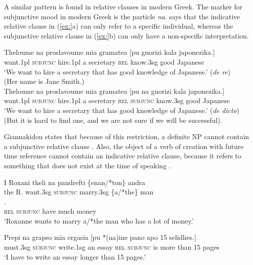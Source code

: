 A similar pattern is found in relative clauses in modern Greek. The marker for subjunctive mood in modern Greek is the particle \textit{na}. \citet{Giannakidou2011} says that the indicative relative clause in (\ref{ex:}a) can only refer to a specific individual, whereas the subjunctive relative clause in (\ref{ex:}b) can only have a non-specific interpretation.


\ea
\ea \gll Theloume  na  proslavoume  mia  gramatea  [pu  gnorizi  kala  japonezika.]\\
want.1pl  \textsc{subjunc}  hire.1pl  a  secretary  \textsc{rel}  know.3sg  good  Japanese\\
\glt ‘We want to hire a secretary that has good knowledge of Japanese.’  (\textit{de re})\\
(Her name is Jane Smith.)\\
\ex \gll  Theloume  na  proslavoume  mia  gramatea [pu  na  gnorizi  kala  japonezika.]\\
want.1pl  \textsc{subjunc}  hire.1pl  a  secretary \textsc{rel}  \textsc{subjunc}  know.3sg  good  Japanese\\
\glt ‘We want to hire a secretary that has good knowledge of Japanese.’  (\textit{de dicto})\\
(But it is hard to find one, and we are not sure if we will be successful).\\
\z \z


Giannakidou states that because of this restriction, a definite NP cannot contain a subjunctive relative clause . Also, the object of a verb of creation with future time reference cannot contain an indicative relative clause, because it refers to something that does not exist at the time of speaking .


\ea 
\ea \gll I  Roxani  theli  na  pandrefti  \{enan/*ton\}  andra\\
the  R.  want.3sg  \textsc{subjunc}  marry.3sg  \{a/*the\}  man\\
\ex \gll{}.\\
 \textsc{rel}  \textsc{subjunc}  have  much  money\\
\glt ‘Roxanne wants to marry a/*the man who has a lot of money.’\\
\z \z

\ea
\gll Prepi  na  grapso  mia  ergasia  [pu  *(na)\footnotemark  ine  pano  apo  15  selidhes.]\\
must.3sg  \textsc{subjunc}  write.1sg  an  essay  \textsc{rel}  \textsc{subjunc}  is  more  than  15  pages\\
\glt ‘I have to write an essay longer than 15 pages.’\\
\z
{}

